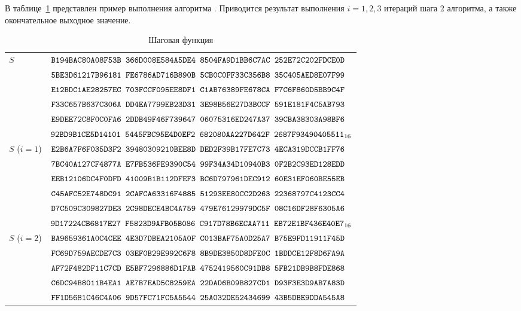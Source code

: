\label{TEST.F}

В таблице~\ref{Table.TEST.F} представлен пример выполнения
алгоритма . Приводится результат 
выполнения $i=1,2,3$ итераций шага 2 алгоритма,
а также окончательное выходное значение.

\clearpage

\begin{table}[H]
\caption{Шаговая функция}\label{Table.TEST.F}
\begin{tabular}{|l|l|}
\hline
$S$ &
$\texttt{B194BAC80A08F53B~366D008E584A5DE4~8504FA9D1BB6C7AC~252E72C202FDCE0D}$\\
&
$\texttt{5BE3D61217B96181~FE6786AD716B890B~5CB0C0FF33C356B8~35C405AED8E07F99}$\\
&
$\texttt{E12BDC1AE28257EC~703FCCF095EE8DF1~C1AB76389FE678CA~F7C6F860D5BB9C4F}$\\
&
$\texttt{F33C657B637C306A~DD4EA7799EB23D31~3E98B56E27D3BCCF~591E181F4C5AB793}$\\
&
$\texttt{E9DEE72C8F0C0FA6~2DDB49F46F739647~06075316ED247A37~39CBA38303A98BF6}$\\
&
$\texttt{92BD9B1CE5D14101~5445FBC95E4D0EF2~682080AA227D642F~2687F93490405511}_{16}$\\
\hline
\hline
$S$ ($i=1$) &
$\texttt{E2B6A7F6F035D3F2~39480309210BEE8D~DED2F39B17FE7C73~4ECA319DCCB1FF76}$\\
&
$\texttt{7BC40A127CF4877A~E7FB536FE9390C54~99F34A34D10940B3~0F2B2C93ED128EDD}$\\
&
$\texttt{EEB12106DC4F0DFD~41009B1B112DFEF3~BC6D797961DEC912~60E31EF060BE55EB}$\\
&
$\texttt{C45AFC52E748DC91~2CAFCA63316F4885~51293EE80CC2D263~22368797C4123CC4}$\\
&
$\texttt{D7C509C309827DE3~2C98DECE4BC4A759~479E76129979DC5F~08C16DF28F6305A6}$\\
&
$\texttt{9D17224CB6817E27~F5823D9AFB05B086~C917D78B6ECAA711~EB72E1BF436E40E7}_{16}$\\
\hline
$S$ ($i=2$) &
$\texttt{BA9659361A0C4CEE~4E3D7DBEA2105A0F~C013BAF75A0D25A7~B75E9FD11911F45D}$\\
&
$\texttt{FC69D759AECDE7C3~03EF0B29E992C6F8~8B9DE3850D8DFE0C~1BDDCE12F8D6FA9A}$\\
&
$\texttt{AF72F482DF11C7CD~E5BF7296886D1FAB~4752419560C91DB8~5FB21DB9B8FDE868}$\\
&
$\texttt{C6DC94B8011B4EA1~AE7B7EAD5C8259EA~22DAD6B09B827CD1~D93F3E3D9AB7A83D}$\\
&
$\texttt{FF1D5681C46C4A06~9D57FC71FC5A5544~25A032DE52434699~43B5DBE9DDA545A8}$\\

\end{tabular}
\end{table}
